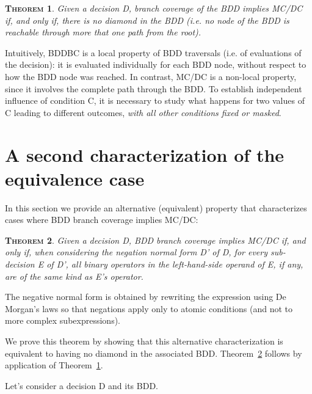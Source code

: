 \documentclass[a4paper,12pt,twoside]{article}
\newtheorem{theorem}{\textsc{Theorem}}
\begin{document}
\begin{theorem}
  \label{thm:no-diamond}
  Given a decision D, branch coverage of the BDD implies MC/DC if,
  and only if, there is no diamond in the BDD (i.e.  no node of the
  BDD is reachable through more that one path from the root).
\end{theorem}

Intuitively, BDDBC is a local property of BDD traversals (i.e. of
evaluations of the decision): it is evaluated individually for each
BDD node, without respect to how the BDD node was reached. In
contrast, MC/DC is a non-local property, since it involves the
complete path through the BDD. To establish independent influence of
condition C, it is necessary to study what happens for two values of C
leading to different outcomes, \emph{with all other conditions fixed
or masked}.

\section{A second characterization of the equivalence case}

In this section we provide an alternative (equivalent) property
that characterizes cases where BDD branch coverage implies MC/DC:

\begin{theorem}
  \label{thm:lhs-same-operator}
  Given a decision D, BDD branch coverage implies MC/DC if, and only if, when
  considering the negation normal form D' of D, for every sub-decision E of D',
  all binary operators in the left-hand-side operand of E, if any, are of the
  same kind as E's operator.
\end{theorem}

The negative normal form is obtained by rewriting the expression using
De Morgan's laws so that negations apply only to atomic conditions (and not
to more complex subexpressions).


We prove this theorem by showing that this alternative characterization is
equivalent to having no diamond in the associated BDD.
Theorem~\ref{thm:lhs-same-operator} follows by application of
Theorem~\ref{thm:no-diamond}.

Let's consider a decision D and its BDD.
\end{document}
